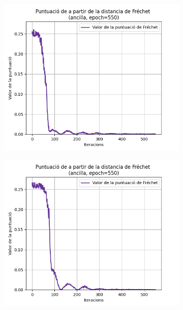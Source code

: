 \begin{figure}[H]
	\begin{subfigure}[b]{.32\linewidth}
		\includegraphics[width=\linewidth]{figures/data/FD_score_A1.png}
		\caption{}
	\end{subfigure}
	\begin{subfigure}[b]{.32\linewidth}
		\includegraphics[width=\linewidth]{figures/data/FD_score_A2.png}
		\caption{}
	\end{subfigure}
	\begin{subfigure}[b]{.32\linewidth}

\end{subfigure}
\end{figure}
